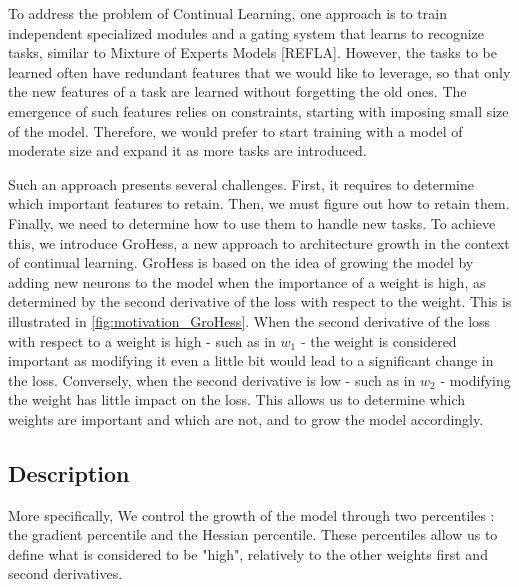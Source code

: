 \documentclass[11pt]{article}
\begin{document}
To address the problem of Continual Learning, one approach is to train independent specialized modules and a gating system that learns to recognize tasks, similar to Mixture of Experts Models [REFLA]. However, the tasks to be learned often have redundant features that we would like to leverage, so that only the new features of a task are learned without forgetting the old ones. The emergence of such features relies on constraints, starting with imposing small size of the model. Therefore, we would prefer to start training with a model of moderate size and expand it as more tasks are introduced.


\vspace{2mm}
\noindent
Such an approach presents several challenges. First, it requires to determine which important features to retain. Then, we must figure out how to retain them. Finally, we need to determine how to use them to handle new tasks. To achieve this, we introduce GroHess, a new approach to architecture growth in the context of continual learning. GroHess is based on the idea of growing the model by adding new neurons to the model when the importance of a weight is high, as determined by the second derivative of the loss with respect to the weight. This is illustrated in \ref{fig:motivation_GroHess}. When the second derivative of the loss with respect to a weight is high - such as in $w_1$ - the weight is considered important as modifying it even a little bit would lead to a significant change in the loss. Conversely, when the second derivative is low - such as in $w_2$ - modifying the weight has little impact on the loss. This allows us to determine which weights are important and which are not, and to grow the model accordingly.



\subsection{Description}


More specifically, We control the growth of the model through two percentiles : the gradient percentile and the Hessian percentile. These percentiles allow us to define what is considered to be "high", relatively to the other weights first and second derivatives.
\end{document}
